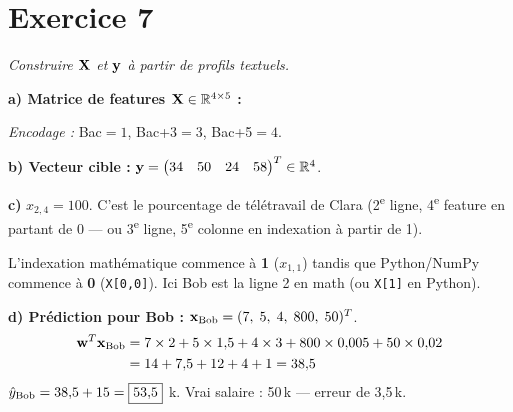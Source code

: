 \section*{Exercice 7 \hfill \exointermediaire}
\textit{Construire $\mathbf{X}$ et $\mathbf{y}$ \`{a} partir de profils textuels.}

\separateur

\textbf{a) Matrice de features $\mathbf{X} \in \mathbb{R}^{4 \times 5}$ :}

\emph{Encodage :} Bac$=1$, Bac+3$=3$, Bac+5$=4$.


\textbf{b) Vecteur cible :}
$\mathbf{y} = \begin{pmatrix} 34 & 50 & 24 & 58 \end{pmatrix}^T \in \mathbb{R}^4$.

\textbf{c)} $x_{2,4} = 100$. C'est le pourcentage de t\'{e}l\'{e}travail de Clara
(2\textsuperscript{e} ligne, 4\textsuperscript{e} feature en partant de 0 --- ou
3\textsuperscript{e} ligne, 5\textsuperscript{e} colonne en indexation \`{a} partir de 1).

\begin{attentionbox}
    L'indexation math\'{e}matique commence \`{a} \textbf{1} ($x_{1,1}$) tandis que Python/NumPy
    commence \`{a} \textbf{0} (\texttt{X[0,0]}). Ici Bob est la ligne 2 en math (ou \texttt{X[1]} en Python).
\end{attentionbox}

\textbf{d) Pr\'{e}diction pour Bob :}
$\mathbf{x}_{\text{Bob}} = (7,\; 5,\; 4,\; 800,\; 50)^T$.
\begin{align*}
    \mathbf{w}^T \mathbf{x}_{\text{Bob}} &= 7 \times 2 + 5 \times 1{,}5 + 4 \times 3 + 800 \times 0{,}005 + 50 \times 0{,}02 \\
    &= 14 + 7{,}5 + 12 + 4 + 1 = 38{,}5
\end{align*}
$\hat{y}_{\text{Bob}} = 38{,}5 + 15 = \boxed{53{,}5}$ k\texteuro. Vrai salaire : 50\,k\texteuro{} --- erreur de 3{,}5\,k\texteuro.

